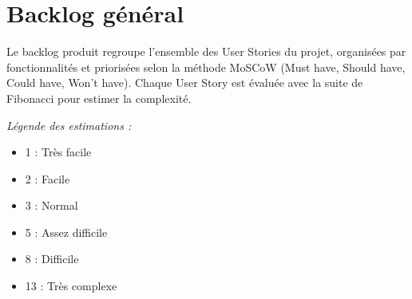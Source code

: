 \documentclass[12pt,a4paper]{report}
\begin{document}
\section{Backlog général}

Le backlog produit regroupe l'ensemble des User Stories du projet, organisées par fonctionnalités et priorisées selon la méthode MoSCoW (Must have, Should have, Could have, Won't have). Chaque User Story est évaluée avec la suite de Fibonacci pour estimer la complexité.

\textit{Légende des estimations :}
\begin{itemize}
    \item 1 : Très facile
    \item 2 : Facile
    \item 3 : Normal
    \item 5 : Assez difficile
    \item 8 : Difficile
    \item 13 : Très complexe
\end{itemize}
\end{document}

